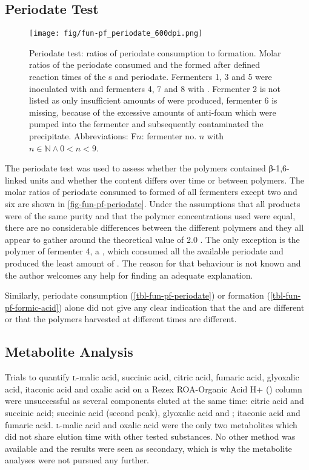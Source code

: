 \subsection{Periodate Test}
\begin{figure}
	\begin{center}
		\texttt{[image: fig/fun-pf\_periodate\_600dpi.png]}
		\caption[Periodate Test: Ratios of Periodate Consumption to \FORA{} Formation]{Periodate test: ratios of periodate consumption to \fora{} formation. Molar ratios of the periodate consumed and the \fora{} formed after defined reaction times of the \eps{}s and periodate. Fermenters 1, 3 and 5 were inoculated with \rolf{} and fermenters 4, 7 and 8 with \comm{}. Fermenter 2 is not listed as only insufficient amounts of \eps{} were produced, fermenter 6 is missing, because of the excessive amounts of anti-foam which were pumped into the fermenter and subsequently contaminated the precipitate. Abbreviations: F$n$: fermenter no. $n$ with $n \in \mathbb{N} \land 0 < n < 9$.\label{fig-fun-pf-periodate}}
	\end{center}
\end{figure}
The periodate test was used to assess whether the polymers contained β-1,6-linked \glc{} units and whether the content differs over time or between polymers. The molar ratios of periodate consumed to \fora{} formed of all fermenters except two and six are shown in \vref{fig-fun-pf-periodate}. Under the assumptions that all products were of the same purity and that the polymer concentrations used were equal, there are no considerable differences between the different polymers and they all appear to gather around the theoretical value of \num{2.0} \cite{BuchRobyt1998}. The only exception is the polymer of fermenter 4, a \shz{}, which consumed all the available periodate and produced the least amount of \fora{}. The reason for that behaviour is not known and the author welcomes any help for finding an adequate explanation.

Similarly, periodate consumption (\vref{tbl-fun-pf-periodate}) or \fora{} formation (\vref{tbl-fun-pf-formic-acid}) alone did not give any clear indication that the \scl{} and \shz{} are different or that the polymers harvested at different times are different.

\subsection{Metabolite Analysis}
Trials to quantify \textsc{l}-malic acid, succinic acid, citric acid, fumaric acid, glyoxalic acid, itaconic acid and oxalic acid on a Rezex ROA-Organic Acid H+ () column were unsuccessful as several components eluted at the same time: citric acid and succinic acid; succinic acid (second peak), glyoxalic acid and \glc{}; itaconic acid and fumaric acid. \textsc{l}-malic acid and oxalic acid were the only two metabolites which did not share elution time with other tested substances. No other method was available and the results were seen as secondary, which is why the metabolite analyses were not pursued any further.

